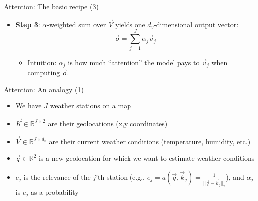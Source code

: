 
\begin{vbframe}{Attention: The basic recipe (3)}

\vfill

\begin{itemize}
	\item \textbf{Step 3}: $\alpha$-weighted sum over $\vec {V}$ yields one $d_v$-dimensional output vector:
	$$\vec {o} = \sum_{j=1}^J \alpha_j \vec {v}_j$$
		\begin{itemize}
			\item Intuition: $\alpha_j$ is how much ``attention'' the model pays to $\vec v_j$ when computing $\vec o$.
		\end{itemize}
\end{itemize}

\vfill

\end{vbframe}


\begin{vbframe}{Attention: An analogy (1)}

\vfill

\begin{itemize}
\item We have $J$ weather stations on a map
\item $\vec K \in \mathbb{R}^{J\times 2}$ are their geolocations (x,y coordinates)
\item $\vec V \in \mathbb{R}^{J \times d_v}$ are their current weather conditions (temperature, humidity, etc.)
\item $\vec q \in \mathbb{R}^2$ is a new geolocation for which we want to estimate weather conditions
\item $e_j$ is the relevance of the $j$'th station (e.g., $e_j = a(\vec q, \vec k_j) = \frac{1}{||\vec q - \vec k_j||_2}$), and $\alpha_j$ is $e_j$ as a probability
\end{itemize}

\vfill

\end{vbframe}


